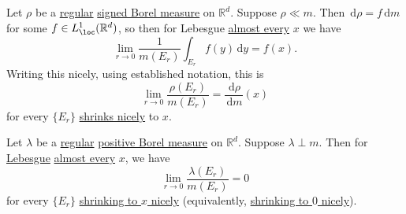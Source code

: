 \begin{corollary}
	Let \(\rho\) be a \hyperref[def:regular]{regular} \hyperref[def:signed-measure]{signed Borel measure} on \(\mathbb{R}^d\). Suppose \(\rho \ll m\). Then \(\,\mathrm{d}\rho = f\,\mathrm{d}m\) for some \(f \in L^1_{\loc}(\mathbb{R}^d)\), so then for Lebesgue \hyperref[def:mu-almost-everywhere]{almost every} \(x\) we have
	\[
		\lim_{r \to 0} \frac{1}{m(E_r)} \int_{E_r} f(y) \,\mathrm{d}y = f(x).
	\]
	Writing this nicely, using established notation, this is
	\[
		\lim_{r \to 0} \frac{\rho(E_r)}{m(E_r)} = \frac{\,\mathrm{d}\rho}{\,\mathrm{d}m}(x)
	\]
	for every \(\{E_r\}\) \hyperref[def:shrink-nicely]{shrinks nicely} to \(x\).
\end{corollary}

\begin{proposition}\label{prop:lec-32}
	Let \(\lambda\) be a \hyperref[def:regular]{regular} \hyperref[def:signed-measure]{positive Borel measure} on \(\mathbb{R}^d\). Suppose \(\lambda \perp m\). Then for \hyperref[def:Lebesgue-measure]{Lebesgue} \hyperref[def:mu-almost-everywhere]{almost every} \(x\), we have
	\[
		\lim_{r \to 0} \frac{\lambda(E_r)}{m(E_r)} = 0
	\]
	for every \(\{E_r\}\) \hyperref[def:shrink-nicely]{shrinking to \(x\) nicely} (equivalently, \hyperref[def:shrink-nicely]{shrinking to \(0\) nicely}).
\end{proposition}

